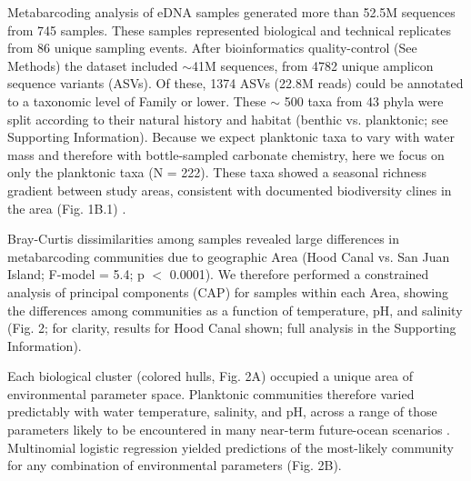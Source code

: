 \documentclass[11pt]{article}
\begin{document}
\begin{linenumbers}
Metabarcoding analysis of eDNA samples generated more than 52.5M sequences from 745 samples. These samples represented biological and technical replicates from 86 unique sampling events. After bioinformatics quality-control (See Methods) the dataset included $\sim${}41M sequences, from 4782 unique amplicon sequence variants (ASVs). Of these, 1374 ASVs (22.8M reads) could be annotated to a taxonomic level of Family or lower. These $\sim$ 500 taxa from 43 phyla were split according to their natural history and habitat (benthic vs. planktonic; see Supporting Information). Because we expect planktonic taxa to vary with water mass \cite{kelly2018tides} and therefore with bottle-sampled carbonate chemistry, here we focus on only the planktonic taxa (N = 222). These taxa showed a seasonal richness gradient between study areas, consistent with documented biodiversity clines in the area (Fig. 1B.1) \cite{dethier_decadal_2008}.

Bray-Curtis dissimilarities among samples revealed large differences in metabarcoding communities due to geographic Area (Hood Canal vs. San Juan Island; F-model = 5.4; p $<$ 0.0001). We therefore performed a constrained analysis of principal components (CAP) for samples within each Area, showing the differences among communities as a function of temperature, pH, and salinity (Fig. 2; for clarity, results for Hood Canal shown; full analysis in the Supporting Information). 

 Each biological cluster (colored hulls, Fig. 2A) occupied a unique area of environmental parameter space. Planktonic communities therefore varied predictably with water temperature, salinity, and pH, across a range of those parameters likely to be encountered in many near-term future-ocean scenarios \cite{murray2015inland}. 
 Multinomial logistic regression yielded predictions of the most-likely community for any combination of environmental parameters (Fig. 2B).


\end{linenumbers}
\end{document}
